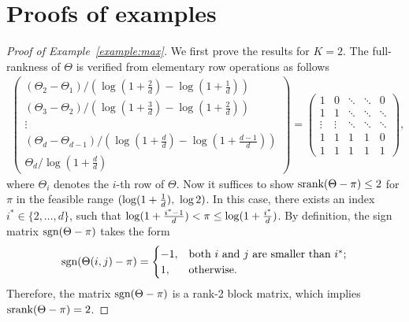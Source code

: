 \documentclass[twoside,11pt]{article}
\theoremstyle{plain}
\theoremstyle{definition}
\def\sign{\textup{sgn}}
\def\srank{\textup{srank}}
\begin{document}
\section{Proofs of examples}

\begin{proof}[Proof of Example~\ref{example:max}]
We first prove the results for $K=2$. The full-rankness of $\Theta$ is verified from elementary row operations as follows
\begin{align}
\begin{pmatrix}
(\Theta_2-\Theta_1)/(\log(1+\frac{2}{d})-\log(1+\frac{1}{d}))\\(\Theta_3-\Theta_2)/(\log(1+\frac{3}{d})-\log(1+\frac{2}{d}))\\\vdots\\ (\Theta_d-\Theta_{d-1})/(\log(1+\frac{d}{d})-\log(1+\frac{d-1}{d}))\\\Theta_d/\log(1+\frac{d}{d})
\end{pmatrix} = \begin{pmatrix}
 1&          0  &      \ddots  &        \ddots       &          0 \\
1& 1 & \ddots &            \ddots   &   \ddots          \\
      \vdots &     \vdots & \ddots &       \ddots &    \ddots         \\
 1 & 1 &1 & 1 &0\\
 1 & 1 &1 & 1 &1
\end{pmatrix},
\end{align}
where $\Theta_i$ denotes the $i$-th row of $\Theta$. 
Now it suffices to show $\srank(\Theta-\pi)\leq 2$ for $\pi$ in the feasible range $(\log(1+{1\over d}),\ \log 2)$. In this case, there exists an index $i^*\in\{2,\ldots,d\}$, such that $\log(1+{i^*-1\over d})< \pi\leq \log(1+{i^*\over d})$. By definition, the sign matrix $\sign (\Theta-\pi)$ takes the form
\begin{equation}\label{eq:matrix}
\sign (\Theta(i,j)-\pi)=
\begin{cases}
-1, & \text{both $i$ and $j$ are smaller than $i^*$};\\
1, & \text{otherwise}.
\end{cases}
\end{equation}
Therefore, the matrix $\sign (\Theta-\pi)$ is a rank-2 block matrix, which implies $\srank(\Theta-\pi)=2$. 


\end{proof}
\end{document}
